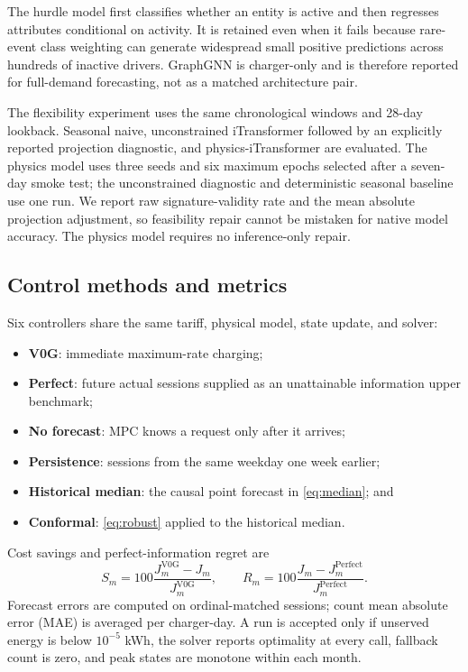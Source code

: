 \documentclass[11pt]{article}
\begin{document}
The hurdle model first classifies whether an entity is active and then
regresses attributes conditional on activity.  It is retained even when it
fails because rare-event class weighting can generate widespread small
positive predictions across hundreds of inactive drivers.  GraphGNN is
charger-only and is therefore reported for full-demand forecasting, not as a
matched architecture pair.

The flexibility experiment uses the same chronological windows and 28-day
lookback.  Seasonal naive, unconstrained iTransformer followed by an explicitly
reported projection diagnostic, and physics-iTransformer are evaluated.  The
physics model uses three seeds and six maximum epochs selected after a
seven-day smoke test; the unconstrained diagnostic and deterministic seasonal
baseline use one run.  We report raw signature-validity rate and the mean
absolute projection adjustment, so feasibility repair cannot be mistaken for
native model accuracy.  The physics model requires no inference-only repair.

\subsection{Control methods and metrics}

Six controllers share the same tariff, physical model, state update, and
solver:
\begin{itemize}
 \item \textbf{V0G}: immediate maximum-rate charging;
 \item \textbf{Perfect}: future actual sessions supplied as an unattainable
 information upper benchmark;
 \item \textbf{No forecast}: MPC knows a request only after it arrives;
 \item \textbf{Persistence}: sessions from the same weekday one week earlier;
 \item \textbf{Historical median}: the causal point forecast in
 \eqref{eq:median}; and
 \item \textbf{Conformal}: \eqref{eq:robust} applied to the historical median.
\end{itemize}
Cost savings and perfect-information regret are
\begin{equation}
 S_m=100\frac{J^{\mathrm{V0G}}_m-J_m}{J^{\mathrm{V0G}}_m},
 \qquad
 R_m=100\frac{J_m-J^{\mathrm{Perfect}}_m}
 {J^{\mathrm{Perfect}}_m}.                            \label{eq:metrics}
\end{equation}
Forecast errors are computed on ordinal-matched sessions; count mean absolute
error (MAE) is averaged per charger-day.  A run is accepted only if unserved
energy is below \(10^{-5}\) kWh, the solver reports optimality at every call,
fallback count is zero, and peak states are monotone within each month.
\end{document}
